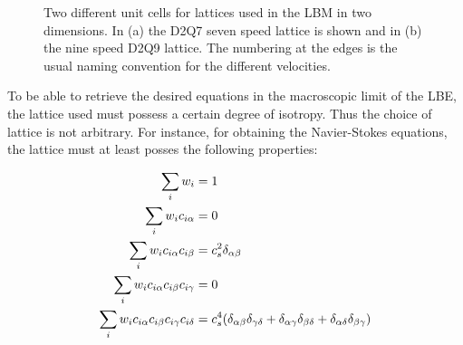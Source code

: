 \begin{figure}
  \centering
  \hspace{15pt} 
  \caption{Two different unit cells for lattices used in the LBM in two
    dimensions. In (a) the D2Q7 seven speed lattice is shown and in
    (b) the nine speed D2Q9 lattice. The numbering at the edges is the
    usual naming convention for the different velocities.}
  \label{fig:lbm:lattices}
\end{figure}
 
To be able to retrieve the desired equations in the macroscopic limit
of the LBE, the lattice used must possess a certain degree of
isotropy. Thus the choice of lattice is not arbitrary. For instance,
for obtaining the Navier-Stokes equations, the lattice must at least
posses the following properties:

\begin{subequations}\label{eq:lbm:i0}\label{eq:lbm:i1}\label{eq:lbm:i2}\label{eq:lbm:i3}\label{eq:lbm:i4}
\begin{align}
\sum_i w_i &= 1\\
\sum_i w_ic_{i\alpha} &= 0 \\
\sum_i w_ic_{i\alpha}c_{i\beta} &= c_s^2\delta_{\alpha \beta}\\
\sum_i w_ic_{i\alpha}c_{i\beta}c_{i\gamma} &= 0\\
\sum_i w_ic_{i\alpha}c_{i\beta}c_{i\gamma}c_{i\delta} &= c_s^4(\delta_{\alpha\beta}\delta_{\gamma\delta}+ \delta_{\alpha\gamma}\delta_{\beta\delta} +\delta_{\alpha\delta}\delta_{\beta\gamma})
\end{align}
\end{subequations}

